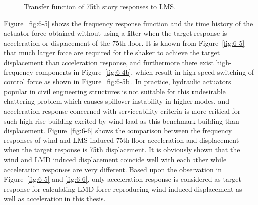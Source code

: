 \begin{figure}[!ht]
\centering
{}
\caption{Transfer function of 75th story responses to LMS.}
\label{fig:6-4}
\end{figure}

Figure~\ref{fig:6-5} shows the frequency response function and the time history of the actuator force obtained without using a filter when the target response is acceleration or displacement of the 75th floor. It is known from Figure~\ref{fig:6-5} that much larger force are required for the shaker to achieve the target displacement than acceleration response, and furthermore there exist high-frequency components in Figure~\ref{fig:6-4b}, which result in high-speed switching of control force as shown in Figure~\ref{fig:6-5b}. In practice, hydraulic actuators popular in civil engineering structures is not suitable for this undesirable chattering problem which causes spillover instability in higher modes, and acceleration response concerned with serviceability criteria is more critical for such high-rise building excited by wind load as this benchmark building than displacement. 
Figure~\ref{fig:6-6} shows the comparison between the frequency responses of wind and LMS induced 75th-floor acceleration and displacement when the target response is 75th displacement. It is obviously shown that the wind and LMD induced displacement coincide well with each other while acceleration responses are very different. Based upon the observation in Figure~\ref{fig:6-5} and  \ref{fig:6-6}, only acceleration response is considered as target response for calculating LMD force reproducing wind induced displacement as well as acceleration in this thesis.

